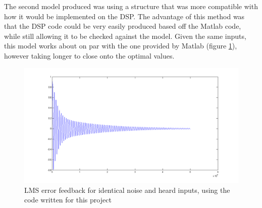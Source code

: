 \noindent The second model produced was using a structure that was more compatible with how it would be implemented on the DSP.
The advantage of this method was that the DSP code could be very easily produced based off the Matlab code, while still allowing it to be checked against the model.
Given the same inputs, this model works about on par with the one provided by Matlab (figure \ref{fig:modellmscancelmine}), however taking longer to close onto the optimal values.

\begin{figure}[H]
	\centering
	\includegraphics[width=\textwidth]{./img/lmssnr_cancel_mine.png}
	\caption{LMS error feedback for identical noise and heard inputs, using the code written for this project}
	\label{fig:modellmscancelmine}
\end{figure}

